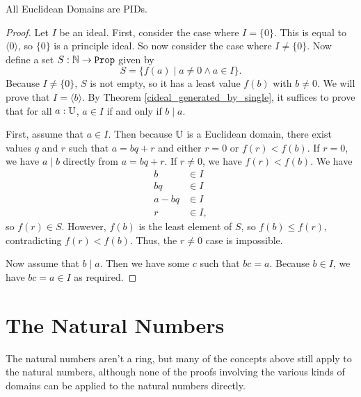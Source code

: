 \documentclass[../../math.tex]{subfiles}
\begin{document}
\begin{instance}
    All Euclidean Domains are PIDs.
\end{instance}
\begin{proof}
    Let $I$ be an ideal.  First, consider the case where $I = \{0\}$.  This is
    equal to $\langle 0 \rangle$, so $\{0\}$ is a principle ideal.  So now
    consider the case where $I \neq \{0\}$.  Now define a set $S : \N \to \Prop$
    given by
    \[
        S = \{f(a) \mid a \neq 0 \wedge a \in I\}.
    \]
    Because $I \neq \{0\}$, $S$ is not empty, so it has a least value $f(b)$
    with $b \neq 0$.  We will prove that $I = \langle b \rangle$.  By Theorem
    \ref{cideal_generated_by_single}, it suffices to prove that for all $a :
    \mathbb{U}$, $a \in I$ if and only if $b \mid a$.

    First, assume that $a \in I$.  Then because $\mathbb{U}$ is a Euclidean domain,
    there exist values $q$ and $r$ such that $a = bq + r$ and either $r = 0$ or
    $f(r) < f(b)$.  If $r = 0$, we have $a \mid b$ directly from $a = bq + r$.
    If $r \neq 0$, we have $f(r) < f(b)$.  We have
    \begin{align*}
        b &\in I \\
        bq &\in I \\
        a - bq &\in I \\
        r &\in I,
    \end{align*}
    so $f(r) \in S$.  However, $f(b)$ is the least element of $S$, so $f(b) \leq
    f(r)$, contradicting $f(r) < f(b)$.  Thus, the $r \neq 0$ case is
    impossible.

    Now assume that $b \mid a$.  Then we have some $c$ such that $bc = a$.
    Because $b \in I$, we have $bc = a \in I$ as required.
\end{proof}

\section{The Natural Numbers}

The natural numbers aren't a ring, but many of the concepts above still apply to
the natural numbers, although none of the proofs involving the various kinds of
domains can be applied to the natural numbers directly.
\end{document}
